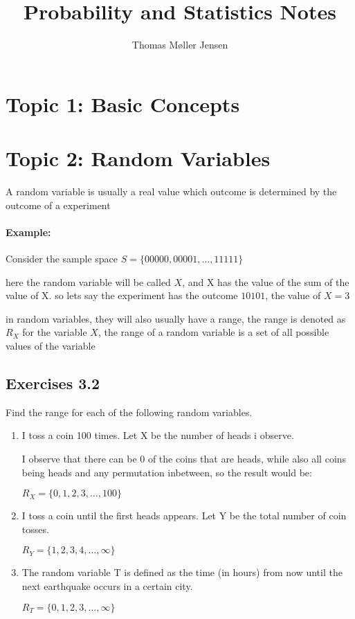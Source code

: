 \documentclass{article}
\title{Probability and Statistics Notes}
\author{Thomas Møller Jensen}
\begin{document}

\maketitle
\section*{Topic 1: Basic Concepts}

\section*{Topic 2: Random Variables}
A random variable is usually a real value which outcome is determined by the outcome of a experiment

\paragraph{Example:}

Consider the sample space $S=\{00000, 00001, \ldots, 11111\}$

here the random variable will be called $X$, and X has the value of the sum of the value of X. so lets say the experiment has the outcome $10101$, the value of $X=3$

in random variables, they will also usually have a range, the range is denoted as $R_X$ for the variable $X$, the range of a random variable is a set of all possible values of the variable



\subsection*{Exercises 3.2}
Find the range for each of the following random variables.

	\begin{enumerate}
		\item I toss a coin 100 times. Let X be the number of heads i observe.
	
		I observe that there can be 0 of the coins that are heads, while also all coins being heads and any permutation inbetween, so the result would be:

		$R_X=\{0,1,2,3, \ldots, 100\}$
	
		\item I toss a coin until the first heads appears. Let Y be the total number of coin tosses.

		$R_Y=\{1,2,3,4,\ldots, \infty\}$

		\item The random variable T is defined as the time (in hours) from now until the next earthquake occurs in a certain city.

		$R_T=\{0,1,2,3, \ldots, \infty\}$
	\end{enumerate}
\end{document}
